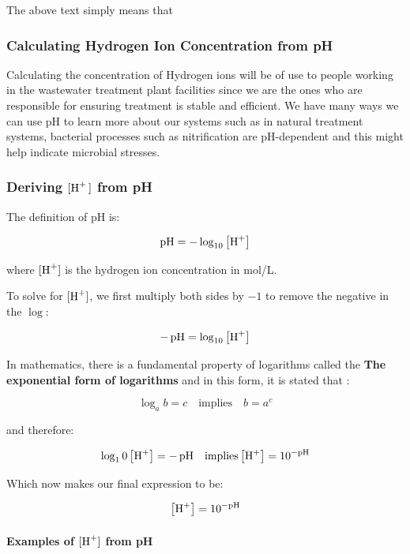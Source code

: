The above text simply means that 


\subsubsection{Calculating Hydrogen Ion Concentration from pH}
Calculating the concentration of Hydrogen ions will be of use to people working in the wastewater treatment plant facilities since we are the ones who are responsible for ensuring treatment is stable and efficient. We have many ways we can use pH to learn more about our systems such as in natural treatment systems, bacterial processes such as \gls{nitrification} are pH-dependent and this might help indicate microbial stresses.


\subsubsection*{Deriving \(\ce{[H^+ ]}\) from pH}
The definition of pH is:

\begin{equation}
\mathrm{pH} = -\log_{10}\left[\ce{H+}\right]
\end{equation}

where \([\ce{H+}]\) is the hydrogen ion concentration in mol/L.

To solve for \([\ce{H+}]\), we first multiply both sides by \(-1\) to remove the negative in the \( \log \):

\begin{equation}
-\,\mathrm{pH} = \log_{10} \left[\ce{H+}\right]
\end{equation}

In mathematics, there is a fundamental property of logarithms called the \textbf{The exponential form of logarithms} and in this form, it is stated that \cite{openstax_log_properties}:

\[
\log_a b = c \quad \text{implies} \quad b = a^c
\]

and therefore:

\[
\log_10 \left[\ce{H+}\right] = -\,\mathrm{pH} \quad \text{implies} \left[\ce{H+}\right] = 10^{-\mathrm{pH}}
\]

Which now makes our final expression to be:

\begin{equation}
\left[\ce{H+}\right] = 10^{-\mathrm{pH}}
\end{equation}


\paragraph*{Examples of \([\ce{H+}]\) from pH}

